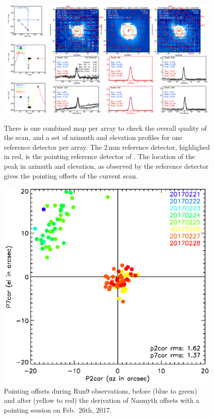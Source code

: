 \begin{figure}[p]
\begin{center}
\includegraphics[clip, angle=0, scale = 0.30]{Figures/plot_20170418s192.png}
\caption[Summary plots of the reduction of pointing scan.]{There is one combined
  map per array to check the overall quality of the scan, and a set of azimuth
  and elevation profiles for one reference detector per array. The 2\,mm reference
  detector, highlighed in red, is the pointing reference detector of
  \nika. The location of the peak in azimuth and elevation, as observed by the
  reference detector gives the pointing offsets of the current scan.}
\label{fig:ptg}
\end{center}
\begin{center}
\includegraphics[clip, angle=0, scale = 0.70]{Figures/pointing_stats_N2R9.eps}
\caption[Pointing session results]{Pointing offsets during Run9 observations,
  before (blue to green) and after (yellow to red) the
  derivation of Nasmyth offsets with a pointing session on Feb.~26th, 2017.}
\label{fig:pointing_stats_n2r9}
\end{center}
\end{figure}

